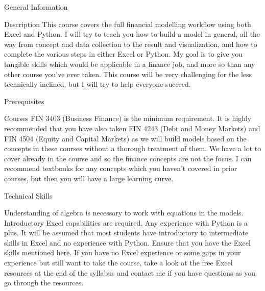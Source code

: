 \documentclass[11pt]{resume}
\begin{document}
\begin{section}{General Information}
\begin{subsection}{Description}
This course covers the full financial modelling workflow using both Excel and Python. I will try to teach you
how to build a model in general, all the way from concept and data collection to the result and visualization,
and how to complete the various steps in either Excel or Python. My goal is to give you tangible skills which
would be applicable in a finance job, and more so than any other course you’ve ever taken. This course will
be very challenging for the less technically inclined, but I will try to help everyone succeed.
\end{subsection}
\begin{subsection}{Prerequisites}
\begin{subsubsection}{Courses}
FIN 3403 (Business Finance) is the minimum requirement. It is highly recommended that you have also taken
FIN 4243 (Debt and Money Markets) and FIN 4504 (Equity and Capital Markets) as we will build models
based on the concepts in these courses without a thorough treatment of them. We have a lot to cover already
in the course and so the finance concepts are not the focus. I can recommend textbooks for any concepts
which you haven’t covered in prior courses, but then you will have a large learning curve.
\end{subsubsection}
\begin{subsubsection}{Technical Skills}

Understanding of algebra is necessary to work with equations in the models. Introductory Excel capabilities
are required. Any experience with Python is a plus. It will be assumed that most students have introductory to
intermediate skills in Excel and no experience with Python. Ensure that you have the Excel skills mentioned here.
If you have no Excel experience or some gaps in your experience but still want to
take the course, take a look at the free Excel resources at the end of the syllabus and contact me if
you have questions as you go through the resources.
        

\end{subsubsection}
\end{subsection}
\end{section}
\end{document}

